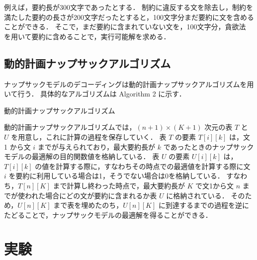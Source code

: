\documentclass[japanese]{jnlp_1.4}
\begin{document}
例えば，要約長が300文字であったとする．
制約に違反する文を除去し，制約を満たした要約の長さが200文字だったとすると，100文字分まだ要約に文を含めることができる．
そこで，まだ要約に含まれていない文を，100文字分，貪欲法 \cite{khuller99} を用いて要約に含めることで，実行可能解を求める．



\subsection{動的計画ナップサックアルゴリズム}

ナップサックモデルのデコーディングは動的計画ナップサックアルゴリズムを用いて行う．
具体的なアルゴリズムは Algorithm 2 に示す．

\begin{algorithm}[t]
\caption{動的計画ナップサックアルゴリズム}
\begin{algorithmic}[1]
\ENDFOR
{}
	\ENDFOR
		\ENDIF
	\ENDFOR
\ENDFOR
{}
	\ENDIF
\ENDFOR
{}
\end{algorithmic}
\end{algorithm}

動的計画ナップサックアルゴリズムでは，$ (n + 1) \times (K + 1) $ 次元の表 $ T $ と $ U $ を用意し，これに計算の過程を保存していく．
表 $ T $ の要素 $ T[i][k] $ は，文 1 から文 $ i $ までが与えられており，最大要約長が $ k $ であったときのナップサックモデルの最適解の目的関数値を格納している．
表 $ U $ の要素 $ U[i][k] $ は，$ T[i][k] $ の値を計算する際に，すなわちその時点での最適値を計算する際に文 $ i $ を要約に利用している場合は1，そうでない場合は0を格納している．
すなわち，$ T[n][K] $ まで計算し終わった時点で，最大要約長が $ K $ で文1から文 $ n $ までが使われた場合にどの文が要約に含まれるか表 $ U $ に格納されている．
そのため，$ U[n][K] $ まで表を埋めたのち，$ U[n][K] $ に到達するまでの過程を逆にたどることで，ナップサックモデルの最適解を得ることができる．



\section{実験}
\end{document}
